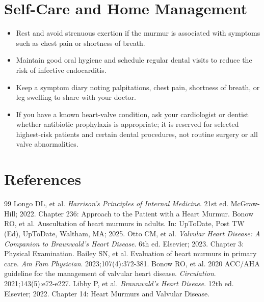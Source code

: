 \section*{Self-Care and Home Management}
\begin{itemize}
  \item Rest and avoid strenuous exertion if the murmur is associated with symptoms such as chest pain or shortness of breath.
  \item Maintain good oral hygiene and schedule regular dental visits to reduce the risk of infective endocarditis.
  \item Keep a symptom diary noting palpitations, chest pain, shortness of breath, or leg swelling to share with your doctor.
  \item If you have a known heart-valve condition, ask your cardiologist or dentist whether antibiotic prophylaxis is appropriate; it is reserved for selected highest-risk patients and certain dental procedures, not routine surgery or all valve abnormalities.
\end{itemize}

\section*{References}

\begin{thebibliography}{99}
 Longo DL, et al. \emph{Harrison's Principles of Internal Medicine}. 21st ed. McGraw-Hill; 2022. Chapter 236: Approach to the Patient with a Heart Murmur.
 Bonow RO, et al. Auscultation of heart murmurs in adults. In: UpToDate, Post TW (Ed), UpToDate, Waltham, MA; 2025.
 Otto CM, et al. \emph{Valvular Heart Disease: A Companion to Braunwald's Heart Disease}. 6th ed. Elsevier; 2023. Chapter 3: Physical Examination.
 Bailey SN, et al. Evaluation of heart murmurs in primary care. \emph{Am Fam Physician}. 2023;107(4):372-381.
 Bonow RO, et al. 2020 ACC/AHA guideline for the management of valvular heart disease. \emph{Circulation}. 2021;143(5):e72-e227.
 Libby P, et al. \emph{Braunwald's Heart Disease}. 12th ed. Elsevier; 2022. Chapter 14: Heart Murmurs and Valvular Disease.
\end{thebibliography}
